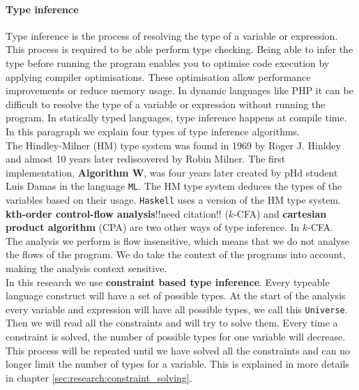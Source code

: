 \documentclass[../main.tex]{subfiles}
\begin{document}
    \paragraph{Type inference}
    Type inference is the process of resolving the type of a variable or expression.
    This process is required to be able perform type checking.
    Being able to infer the type before running the program enables you to optimise code execution by applying compiler optimisations.
    These optimisation allow performance improvements or reduce memory usage.
    In dynamic languages like PHP it can be difficult to resolve the type of a variable or expression without running the program.
    In statically typed languages, type inference happens at compile time.
    In this paragraph we explain four types of type inference algorithms.
    \\
    The Hindley-Milner (HM) type system was found in 1969 by Roger J. Hinldey\cite{Hin:69} and almost 10 years later rediscovered by Robin Milner\cite{Mil:78}.
    The first implementation, \textbf{Algorithm W}\cite{Dam:82}, was four years later created by pHd student Luis Damas in the language \texttt{ML}.
    The HM type system deduces the types of the variables based on their usage.
    \texttt{Haskell} uses a version of the HM type system.
    \\
    \textbf{kth-order control-flow analysis}!!need citation!! ($k$-CFA) and \textbf{cartesian product algorithm} (CPA) are two other ways of type inference.
    In $k$-CFA. 
    \\
    The analysis we perform is flow insensitive, which means that we do not analyse the flows of the program.
    We do take the context of the programs into account, making the analysis context sensitive.
    \\
    In this research we use \textbf{constraint based type inference}.
    Every typeable language construct will have a set of possible types.
    At the start of the analysis every variable and expression will have all possible types, we call this \texttt{Universe}.
    Then we will read all the constraints and will try to solve them.
    Every time a constraint is solved, the number of possible types for one variable will decrease.
    This process will be repeated until we have solved all the constraints and can no longer limit the number of types for a variable.
    This is explained in more details in chapter \ref{sec:research:constraint_solving}.
    
\end{document}

